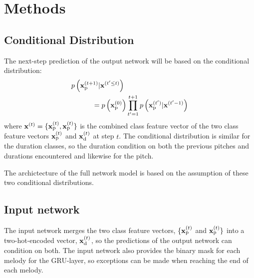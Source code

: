 \section{Methods}
\label{sec:method}

\subsection{Conditional Distribution} %
\label{sub:conditional_distribution}
The next-step prediction of the output network will be based on the conditional distribution:
	\begin{gather}
		\begin{split}
		\MoveEqLeft[3]
				p\left(\vec{x}\order{t+1}\idx{p}|\vec{x}\order{t'\le t}\right) \\ 
				& = p\left(\vec{x}\order{0}\idx{p}\right) \prod^{t+1}_{t'=1} p\left(\vec{x}\order{t'}\idx{p}|\vec{x}\order{t'-1}\right) \label{}
		\end{split} 	
	\end{gather}
	where $\bm{\mathrm{x}}^{(t)}=\{\bm{\mathrm{x}}^{(t)}_{\text{p}}, \bm{\mathrm{x}}^{(t)}_{\text{p}}\}$ is the combined class feature vector of the two class feature vectors $\bm{\mathrm{x}}^{(t)}_{\text{p}}$ and $\bm{\mathrm{x}}^{(t)}_{\text{d}}$ at step $t$. The conditional distribution is similar for the duration classes, so the duration condition on both the previous pitches and durations encountered and likewise for the pitch. 

	The archictecture of the full network model is based on the assumption of these two conditional distributions.

\subsection{Input network} %
\label{sub:input_network}
The input network merges the two class feature vectors, $\{\bm{\mathrm{x}}^{(t)}_{\text{p}}$ and $\bm{\mathrm{x}}^{(t)}_{\text{p}}\}$ into a two-hot-encoded vector, $\bm{\mathrm{x}}^{(t)}_{\text{d}}$, so the predictions of the output network can condition on both. The input network also provides the binary mask for each melody for the GRU-layer, so exceptions can be made when reaching the end of each melody.

